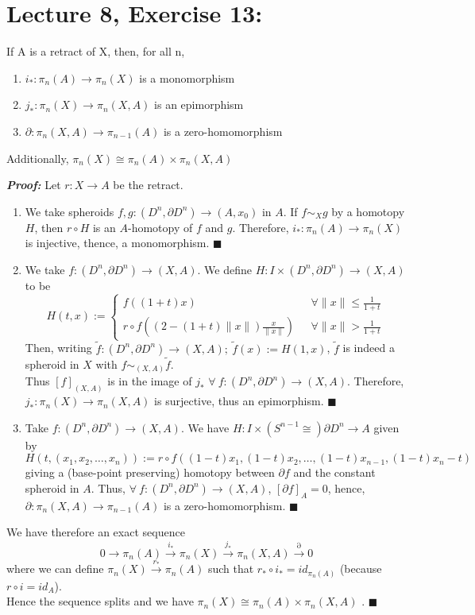 \documentclass[11pt]{article}
\numberwithin{equation}{section}
\begin{document}
\section{\normalsize{Lecture 8, Exercise 13:}}
\begin{thm}
If A is a retract of X, then, for all n,
\begin{enumerate}
\item $i_{*}:\pi_n(A)\rightarrow \pi_n(X)$ is a monomorphism
\item $j_{*}:\pi_n(X)\rightarrow\pi_n(X,A)$ is an epimorphism 
\item $\partial: \pi_n(X,A)\rightarrow \pi_{n-1}(A)$ is a zero-homomorphism
\end{enumerate}
Additionally, $\pi_n(X)\cong \pi_n(A)\times\pi_n(X,A)$
\end{thm}
\textbf{\emph{Proof:}} Let $r:X\rightarrow A$ be the retract.
\begin{enumerate}
	\item We take spheroids $f,g:(D^n,\partial D^n)\rightarrow(A,x_0)$ in $A	$. If $f\sim_X g$ by a homotopy $H$, then $r\circ H$ is an $A$-homotopy of $f$ and $g$. Therefore, $i_{*}:\pi_n(A)\rightarrow \pi_n(X)$ is injective, thence, a monomorphism. $\blacksquare$
	\item We take $f:(D^n,\partial D^n)\rightarrow(X,A)$. We define $H:I\times(D^n,\partial D^n)\rightarrow(X,A)$ to be 
	$$H(t,x):=
	\begin{cases}
	f((1+t)x) &\ \ \ \forall \lVert x\rVert \leqslant \frac{1}{1+t}\\
	r\circ f\left((2-(1+t)\lVert x\rVert)\frac{x}{\lVert x\rVert}\right)&\ \ \ \forall \lVert x\rVert > \frac{1}{1+t}
	\end{cases}$$
	Then, writing $\tilde{f}:(D^n,\partial D^n)\rightarrow(X,A);\ \tilde{f}(x):=H(1,x)$, $\tilde{f}$ is indeed a spheroid in $X$ with $f\sim_{(X,A)}\tilde{f}$. \\ 
	Thus $[f]_{(X,A)}$ is in the image of $j_{*}$ $\forall\ f:(D^n,\partial D^n)\rightarrow(X,A)$. Therefore, $j_{*}:\pi_n(X)\rightarrow\pi_n(X,A)$ is surjective, thus an epimorphism. $\blacksquare$
	\item Take $f:(D^n,\partial D^n)\rightarrow(X,A)$. We have $H:I\times(S^{n-1}\cong)\partial D^n\rightarrow A$ given by 
	$$H(t,(x_1,x_2,\dots,x_n)):=r\circ f((1-t)x_1,(1-t)x_2,\dots, (1-t)x_{n-1}, (1-t)x_n-t)$$ giving a (base-point preserving) homotopy between $\partial f$ and the constant spheroid in $A$. Thus, $\forall\ f:(D^n,\partial D^n)\rightarrow(X,A)$, $[\partial f]_A=0$, hence, $\partial: \pi_n(X,A)\rightarrow \pi_{n-1}(A)$ is a zero-homomorphism. $\blacksquare$
\end{enumerate}
We have therefore an exact sequence 
$$0\rightarrow\pi_n(A)\xrightarrow{i_*}\pi_n(X)\xrightarrow{j_*}\pi_n(X,A)\xrightarrow{\partial}0 $$
where we can define $\pi_n(X)\xrightarrow{r_*}\pi_n(A)$ such that $r_*\circ i_* = id_{\pi_n(A)}$ (because $r\circ i = id_A$). \\ Hence the sequence splits and we have $\pi_n(X)\cong \pi_n(A)\times\pi_n(X,A)$ .  $\blacksquare$
\end{document}
